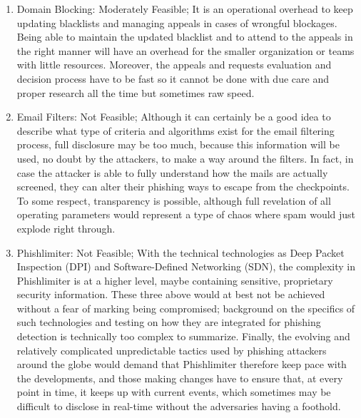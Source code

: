 \begin{enumerate}
     \item Domain Blocking: Moderately Feasible; It is an operational overhead to keep updating blacklists and managing appeals in cases of wrongful blockages. Being able to maintain the updated blacklist and to attend to the appeals in the right manner will have an overhead for the smaller organization or teams with little resources. Moreover, the appeals and requests evaluation and decision process have to be fast so it cannot be done with due care and proper research all the time but sometimes raw speed.
     
    \item Email Filters: Not Feasible;  Although it can certainly be a good idea to describe what type of criteria and algorithms exist for the email filtering process, full disclosure may be too much, because this information will be used, no doubt by the attackers, to make a way around the filters. In fact, in case the attacker is able to fully understand how the mails are actually screened, they can alter their phishing ways to escape from the checkpoints. To some respect, transparency is possible, although full revelation of all operating parameters would represent a type of chaos where spam would just explode right through.
    
   
    \item Phishlimiter: Not Feasible; With the technical technologies as Deep Packet Inspection (DPI) and Software-Defined Networking (SDN), the complexity in Phishlimiter is at a higher level, maybe containing sensitive, proprietary security information. These three above would at best not be achieved without a fear of marking being compromised; background on the specifics of such technologies and testing on how they are integrated for phishing detection is technically too complex to summarize. Finally, the evolving and relatively complicated unpredictable tactics used by phishing attackers around the globe would demand that Phishlimiter therefore keep pace with the developments, and those making changes have to ensure that, at every point in time, it keeps up with current events, which sometimes may be difficult to disclose in real-time without the adversaries having a foothold.
    
\end{enumerate}
